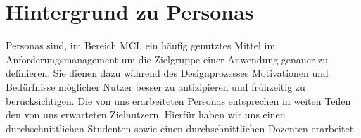 \section{Hintergrund zu Personas}

Personas sind, im Bereich \ac{MCI}, ein häufig genutztes Mittel im Anforderungsmanagement um die Zielgruppe einer Anwendung genauer zu definieren\cite{inproceedings}. Sie dienen dazu während des Designprozesses Motivationen und Bedürfnisse möglicher Nutzer besser zu antizipieren und frühzeitig zu berücksichtigen.
Die von uns erarbeiteten Personas entsprechen in weiten Teilen den von uns erwarteten Zielnutzern. Hierfür haben wir uns einen durchschnittlichen \cite{dzhw2018} Studenten sowie einen durchschnittlichen Dozenten \cite{statista2021} erarbeitet.

